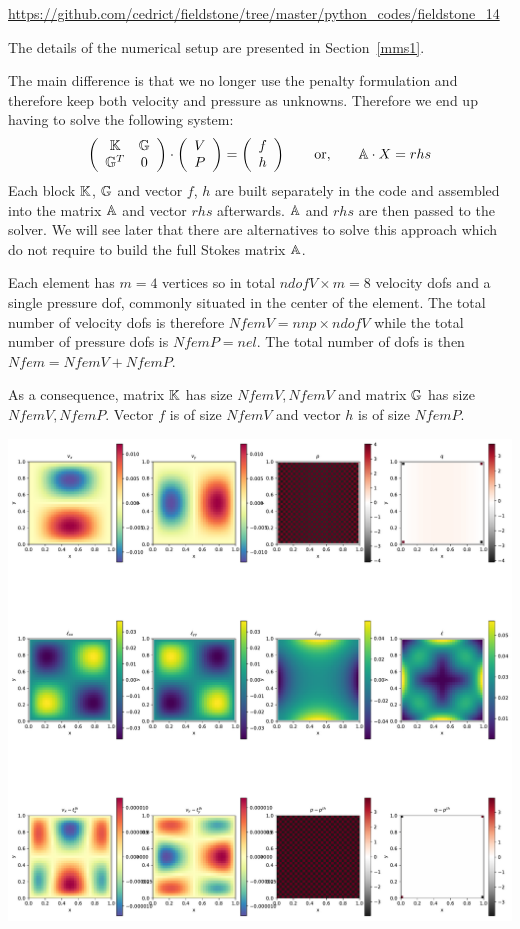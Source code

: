 

\url{https://github.com/cedrict/fieldstone/tree/master/python_codes/fieldstone_14}

The details of the numerical setup are presented in Section~\ref{mms1}.

The main difference is that we no longer use the penalty formulation and therefore 
keep both velocity and pressure as unknowns. Therefore we end up having to solve 
the following system:
\[
\left(
\begin{array}{cc}
{\mathbb{K}} & {\mathbb{G}} \\ {\mathbb{G}}^T & 0 
\end{array}
\right)
\cdot
\left(
\begin{array}{c}
V \\ P
\end{array}
\right)
=
\left(
\begin{array}{c}
 f \\ h
\end{array}
\right)
\quad\quad
{\rm or,}
\quad\quad
{\mathbb{A}} \cdot X = rhs
\]
Each block ${\mathbb{K}}$, ${\mathbb{G}}$ and vector $f$, $h$ are built separately in the code and assembled into 
the matrix ${\mathbb{A}}$ and vector $rhs$ afterwards. ${\mathbb{A}}$ and $rhs$ are then passed to the solver. 
We will see later that there are alternatives to solve this approach which do not require to 
build the full Stokes matrix ${\mathbb{A}}$. 

Each element has $m=4$ vertices so in total $ndofV\times m=8$ velocity dofs and a single 
pressure dof, commonly situated in the center of the element. The total number of 
velocity dofs is therefore $NfemV=nnp \times ndofV$ while the total number of
pressure dofs is $NfemP=nel$. The total number of dofs is then $Nfem=NfemV+NfemP$.

As a consequence, matrix ${\mathbb{K}}$ has size $NfemV,NfemV$ and matrix ${\mathbb{G}}$ has size $NfemV,NfemP$.
Vector $f$ is of size $NfemV$ and vector $h$ is of size $NfemP$.  

\includegraphics[width=14cm]{python_codes/fieldstone_14/solution.pdf}

